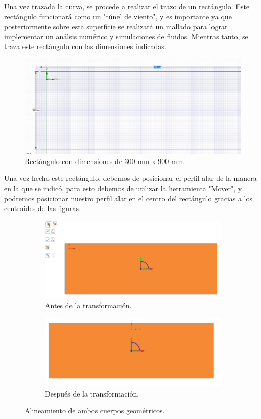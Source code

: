 \documentclass[12pt, letterpaper]{article}
\begin{document}
Una vez trazada la curva, se procede a realizar el trazo de un rectángulo. Este rectángulo funcionará como un "túnel de viento", y es importante ya que posteriormente sobre esta superficie se realizará un mallado para lograr implementar un análsis numérico y simulaciones de fluidos. Mientras tanto, se traza este rectángulo con las dimensiones indicadas.

\begin{figure}[H]
	\centering
	\includegraphics[width=\textwidth]{5.png}
	\caption{Rectángulo con dimensiones de 300 mm x 900 mm.}
\end{figure}

Una vez hecho este rectángulo, debemos de posicionar el perfil alar de la manera en la que se indicó, para esto debemos de utilizar la herramienta "Mover", y podremos posicionar nuestro perfil alar en el centro del rectángulo gracias a los centroides de las figuras.

\begin{figure}[H]
	\centering
	\begin{subfigure}[b]{0.49\linewidth}
		\includegraphics[width=\linewidth]{7.png}
		\caption{Antes de la transformación.}
	\end{subfigure}
	\begin{subfigure}[b]{0.49\linewidth}
		\includegraphics[width=\linewidth]{9.png}
		\caption{Después de la transformación.}
	\end{subfigure}
	\caption{Alineamiento de ambos cuerpos geométricos.}
\end{figure}
\end{document}
